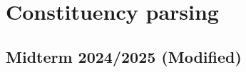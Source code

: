 \documentclass{../extra/aakpract/aakpract}
\begin{document}
	
	
	\section{Constituency parsing}
	
%	
%	
%	
	
	\subsection{Midterm 2024/2025 (Modified)}
	
%			
%			
%			
	
\end{document}
